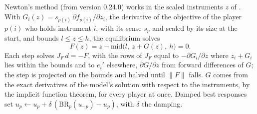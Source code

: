 Newton's method (from version 0.24.0) works in the scaled instruments $z$
of . With $G_i(z) = s_{p(i)}\,\partial f_{p(i)}/\partial
z_i$, the derivative of the objective of the player $p(i)$ who holds
instrument $i$, with its sense $s_p$ and scaled by its size at the start,
and bounds $l \le z \le h$, the equilibrium solves
\begin{equation*}
F(z) = z - \mathrm{mid}\bigl(l,\ z + G(z),\ h\bigr) = 0.
\end{equation*}
Each step solves $J_F\,d = -F$, with the rows of $J_F$ equal to
$-\partial G_i/\partial z$ where $z_i + G_i$ lies within the bounds and to
$e_i'$ elsewhere, $\partial G/\partial z$ from forward differences of $G$;
the step is projected on the bounds and halved until $\|F\|$ falls. $G$
comes from the exact derivatives of the model's solution with respect to the
instruments, by the implicit function theorem, for every player at once.
Damped best responses set $u_p \leftarrow u_p + \delta\,(\mathrm{BR}_p(u_{-p})
- u_p)$, with $\delta$ the damping.


\begin{alsosee}
\end{alsosee}
